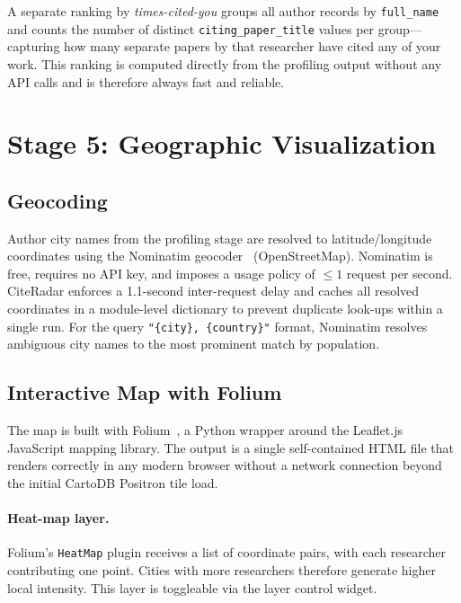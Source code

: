 \documentclass[11pt]{article}
\begin{document}
A separate ranking by \emph{times-cited-you} groups all author records by
\texttt{full\_name} and counts the number of distinct
\texttt{citing\_paper\_title} values per group—capturing how many separate
papers by that researcher have cited any of your work.
This ranking is computed directly from the profiling output without any
API calls and is therefore always fast and reliable.


\section{Stage 5: Geographic Visualization}
\label{sec:map}

\subsection{Geocoding}

Author city names from the profiling stage are resolved to
latitude/longitude coordinates using the Nominatim geocoder~\cite{nominatim}
(OpenStreetMap).
Nominatim is free, requires no API key, and imposes a usage policy of
$\leq 1$ request per second.
CiteRadar enforces a 1.1-second inter-request delay and caches all
resolved coordinates in a module-level dictionary to prevent duplicate
look-ups within a single run.
For the query \texttt{"\{city\}, \{country\}"} format, Nominatim resolves
ambiguous city names to the most prominent match by population.

\subsection{Interactive Map with Folium}

The map is built with Folium~\cite{folium}, a Python wrapper around the
Leaflet.js JavaScript mapping library.
The output is a single self-contained HTML file that renders correctly in
any modern browser without a network connection beyond the initial
CartoDB Positron tile load.

\paragraph{Heat-map layer.}
Folium's \texttt{HeatMap} plugin receives a list of coordinate pairs, with
each researcher contributing one point.
Cities with more researchers therefore generate higher local intensity.
This layer is toggleable via the layer control widget.
\end{document}
